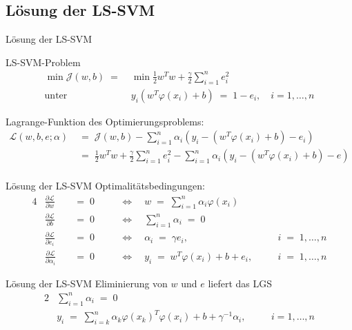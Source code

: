 \documentclass{beamer}
\begin{document}
{\subsection{Lösung der LS-SVM}

\begin{frame}{Lösung der LS-SVM}
	\begin{block}{LS-SVM-Problem}
		\begin{align}
			\min \mathcal{J}(w,b)\;=\;&\min\frac{1}{2}w^Tw+\frac{\gamma}{2}\sum_{i=1}^{n}e_i^2\\
			\text{unter}\quad&y_i\left(w^T\varphi(x_i)+b\right)\;=\;1-e_i,\quad i=1,\dots,n
		\end{align}
	\end{block}
	Lagrange-Funktion des Optimierungsproblems:
	\begin{align}
		\mathcal{L}(w,b,e;\alpha)&\;=\;\mathcal{J}(w,b)-\sum_{i=1}^{n}\alpha_i\left(y_i-\left(w^T\varphi(x_i)+b\right)-e_i\right)\\
		&\;=\;\frac{1}{2}w^Tw+\frac{\gamma}{2}\sum_{i=1}^{n}e_i^2-\sum_{i=1}^{n}\alpha_i\left(y_i-\left(w^T\varphi(x_i)+b\right)-e\right)\\
	\end{align}
\end{frame}

\begin{frame}{Lösung der LS-SVM}
	Optimalitätsbedingungen:
	\begin{alignat}{4}
		& \frac{\partial \mathcal{L}}{\partial w} &&\;=\;0 && \quad\Leftrightarrow\quad w\;=\;\sum_{i=1}^{n}\alpha_i\varphi(x_i) && \\[0,3cm]
		& \frac{\partial \mathcal{L}}{\partial b} &&\;=\;0 && \quad\Leftrightarrow\quad \sum_{i=1}^{n}\alpha_i\;=\;0 && \\[0,3cm]
		& \frac{\partial \mathcal{L}}{\partial e_i} &&\;=\;0 && \quad\Leftrightarrow\quad \alpha_i\;=\;\gamma e_i, && i\;=\;1,\dots,n\\[0,3cm]
		& \frac{\partial \mathcal{L}}{\partial \alpha_i} &&\;=\;0 && \quad\Leftrightarrow\quad y_i\;=\;w^T\varphi(x_i)+b+e_i,\quad && i\;=\;1,\dots,n
	\end{alignat}
\end{frame}

\begin{frame}{Lösung der LS-SVM}
	Eliminierung von $w$ und $e$ liefert das LGS
	\begin{alignat}{2}
		&\sum_{i=1}^{n}\alpha_i \;=\;0 && \\
		&y_i\;=\;\sum_{i=k}^{n}\alpha_k\varphi(x_k)^T\varphi(x_i)+b+\gamma^{-1}\alpha_i,\quad && i=1,\dots,n
	\end{alignat}
\end{frame}

}
\end{document}
